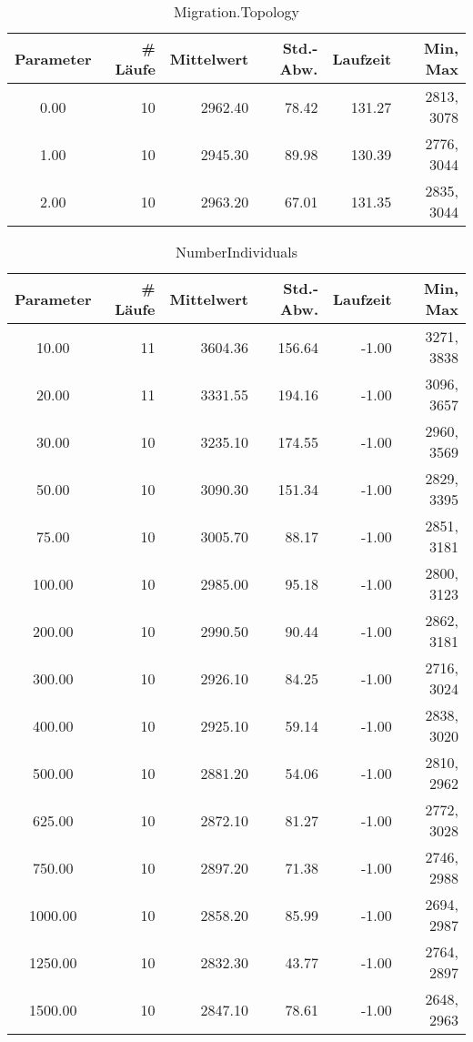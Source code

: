 \begin{table}[tbp]
\begin{tabular}{ | c || r | r | r | r | r | }
\hline
Parameter & \# Läufe & Mittelwert & Std.-Abw. & Laufzeit & Min, Max \\
\hline
   0.00 &  10 & 2962.40 &   78.42 &  131.27 & 2813, 3078 \\
   1.00 &  10 & 2945.30 &   89.98 &  130.39 & 2776, 3044 \\
   2.00 &  10 & 2963.20 &   67.01 &  131.35 & 2835, 3044 \\
\hline
\end{tabular}
\caption{Migration.Topology}
\end{table}


\begin{table}[tbp]
\begin{tabular}{ | c || r | r | r | r | r | }
\hline
Parameter & \# Läufe & Mittelwert & Std.-Abw. & Laufzeit & Min, Max \\
\hline
  10.00 &  11 & 3604.36 &  156.64 &   -1.00 & 3271, 3838 \\
  20.00 &  11 & 3331.55 &  194.16 &   -1.00 & 3096, 3657 \\
  30.00 &  10 & 3235.10 &  174.55 &   -1.00 & 2960, 3569 \\
  50.00 &  10 & 3090.30 &  151.34 &   -1.00 & 2829, 3395 \\
  75.00 &  10 & 3005.70 &   88.17 &   -1.00 & 2851, 3181 \\
 100.00 &  10 & 2985.00 &   95.18 &   -1.00 & 2800, 3123 \\
 200.00 &  10 & 2990.50 &   90.44 &   -1.00 & 2862, 3181 \\
 300.00 &  10 & 2926.10 &   84.25 &   -1.00 & 2716, 3024 \\
 400.00 &  10 & 2925.10 &   59.14 &   -1.00 & 2838, 3020 \\
 500.00 &  10 & 2881.20 &   54.06 &   -1.00 & 2810, 2962 \\
 625.00 &  10 & 2872.10 &   81.27 &   -1.00 & 2772, 3028 \\
 750.00 &  10 & 2897.20 &   71.38 &   -1.00 & 2746, 2988 \\
1000.00 &  10 & 2858.20 &   85.99 &   -1.00 & 2694, 2987 \\
1250.00 &  10 & 2832.30 &   43.77 &   -1.00 & 2764, 2897 \\
1500.00 &  10 & 2847.10 &   78.61 &   -1.00 & 2648, 2963 \\
\hline
\end{tabular}
\caption{NumberIndividuals}
\end{table}


